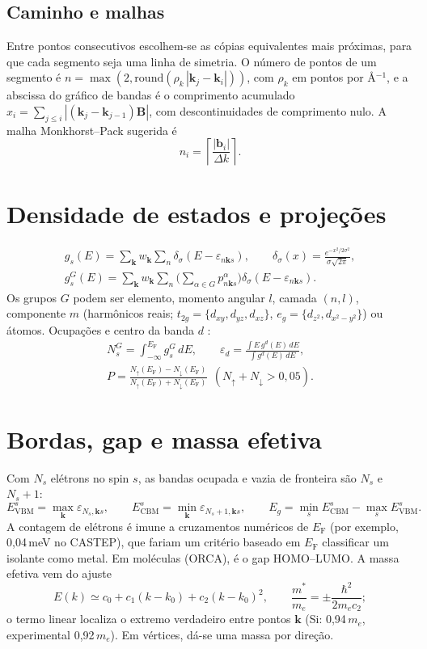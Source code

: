\documentclass[11pt,a4paper]{article}
\newcommand{\kv}{\mathbf k}\newcommand{\eF}{E_\mathrm{F}}\newcommand{\code}[1]{\texttt{#1}}
\begin{document}
\subsection{Caminho e malhas}
Entre pontos consecutivos escolhem-se as cópias equivalentes mais próximas, para que cada segmento seja uma linha de simetria. O número de pontos de um segmento é $n=\max(2,\mathrm{round}(\rho_k\,|\kv_j-\kv_i|))$, com $\rho_k$ em pontos por Å$^{-1}$, e a abscissa do gráfico de bandas é o comprimento acumulado $x_i=\sum_{j\le i}|(\kv_j-\kv_{j-1})\mathbf B|$, com descontinuidades de comprimento nulo. A malha Monkhorst--Pack \cite{monkhorst1976} sugerida é
\begin{equation}
n_i=\left\lceil\frac{|\mathbf b_i|}{\Delta k}\right\rceil .
\end{equation}

\section{Densidade de estados e projeções}
\begin{gather}
g_s(E)=\sum_{\kv}w_{\kv}\sum_n\delta_\sigma(E-\varepsilon_{n\kv s}),\qquad \delta_\sigma(x)=\frac{e^{-x^2/2\sigma^2}}{\sigma\sqrt{2\pi}},\\
g^{G}_s(E)=\sum_{\kv}w_{\kv}\sum_n\Big(\sum_{\alpha\in G}p^\alpha_{n\kv s}\Big)\delta_\sigma(E-\varepsilon_{n\kv s}).
\end{gather}
Os grupos $G$ podem ser elemento, momento angular $l$, camada $(n,l)$, componente $m$ (harmônicos reais; $t_{2g}=\{d_{xy},d_{yz},d_{xz}\}$, $e_g=\{d_{z^2},d_{x^2-y^2}\}$) ou átomos. Ocupações e centro da banda $d$ \cite{hammer1995}:
\begin{gather}
N^{G}_s=\int_{-\infty}^{\eF}g^{G}_s\,dE,\qquad \varepsilon_d=\frac{\int E\,g^d(E)\,dE}{\int g^d(E)\,dE},\\ P=\frac{N_\uparrow(\eF)-N_\downarrow(\eF)}{N_\uparrow(\eF)+N_\downarrow(\eF)}\ \ (N_\uparrow+N_\downarrow>0{,}05).
\end{gather}

\section{Bordas, gap e massa efetiva}
Com $N_s$ elétrons no spin $s$, as bandas ocupada e vazia de fronteira são $N_s$ e $N_s+1$:
\begin{equation}
E^{s}_\mathrm{VBM}=\max_{\kv}\varepsilon_{N_s,\kv s},\qquad E^{s}_\mathrm{CBM}=\min_{\kv}\varepsilon_{N_s+1,\kv s},\qquad E_g=\min_sE^{s}_\mathrm{CBM}-\max_sE^{s}_\mathrm{VBM}.
\end{equation}
A contagem de elétrons é imune a cruzamentos numéricos de $\eF$ (por exemplo, 0,04\,meV no CASTEP), que fariam um critério baseado em $\eF$ classificar um isolante como metal. Em moléculas (ORCA), é o gap HOMO--LUMO. A massa efetiva vem do ajuste
\begin{equation}
E(k)\simeq c_0+c_1(k-k_0)+c_2(k-k_0)^2,\qquad \frac{m^*}{m_e}=\pm\frac{\hbar^2}{2m_e c_2};
\end{equation}
o termo linear localiza o extremo verdadeiro entre pontos $\kv$ (Si: 0,94\,$m_e$, experimental 0,92\,$m_e$). Em vértices, dá-se uma massa por direção.
\end{document}
